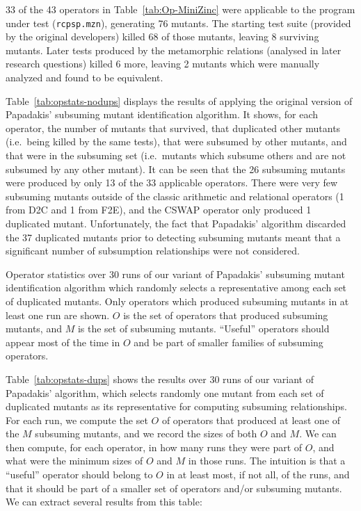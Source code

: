 33 of the 43 operators in Table~\ref{tab:Op-MiniZinc} were applicable to the program under test (\texttt{rcpsp.mzn}), generating 76 mutants. The starting test suite (provided by the original developers) killed 68 of those mutants, leaving 8 surviving mutants. Later tests produced by the metamorphic relations (analysed in later research questions) killed 6 more, leaving 2 mutants which were manually analyzed and found to be equivalent.

Table~\ref{tab:opstats-nodups} displays the results of applying the original version of Papadakis' subsuming mutant identification algorithm. It shows, for each operator, the number of mutants that survived, that duplicated other mutants (i.e.\ being killed by the same tests), that were subsumed by other mutants, and that were in the subsuming set (i.e.\ mutants which subsume others and are not subsumed by any other mutant). It can be seen that the 26 subsuming mutants were produced by only 13 of the 33 applicable operators. There were very few subsuming mutants outside of the classic arithmetic and relational operators (1 from D2C and 1 from F2E), and the CSWAP operator only produced 1 duplicated mutant. Unfortunately, the fact that Papadakis' algorithm discarded the 37 duplicated mutants prior to detecting subsuming mutants meant that a significant number of subsumption relationships were not considered.

\begin{table}
    \centering
    
    \caption{Operator statistics over 30 runs of our variant of Papadakis' subsuming mutant identification algorithm which randomly selects a representative among each set of duplicated mutants. Only operators which produced subsuming mutants in at least one run are shown. $O$ is the set of operators that produced subsuming mutants, and $M$ is the set of subsuming mutants. ``Useful'' operators should appear most of the time in $O$ and be part of smaller families of subsuming operators.}
    \label{tab:opstats-dups}
\end{table}

Table~\ref{tab:opstats-dups} shows the results over 30 runs of our variant of Papadakis' algorithm, which selects randomly one mutant from each set of duplicated mutants as its representative for computing subsuming relationships.
For each run, we compute the set $O$ of operators that produced at least one of the $M$ subsuming mutants, and we record the sizes of both $O$ and $M$.
We can then compute, for each operator, in how many runs they were part of $O$, and what were the minimum sizes of $O$ and $M$ in those runs.
The intuition is that a ``useful'' operator should belong to $O$ in at least most, if not all, of the runs, and that it should be part of a smaller set of operators and/or subsuming mutants.
We can extract several results from this table:

